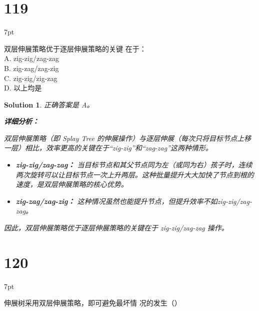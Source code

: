 \documentclass[UTF8]{report}
\newtheorem{solution}{Solution}
\theoremstyle{MyLineTheoremStyle} %
\theoremstyle{MyBlockTheoremStyle} %
\theoremstyle{MySubsubsectionStyle} %
\newenvironment{graybox}{%
        \def\FrameCommand{%
        \hspace{1pt}%
        {\color{gray}\small \vrule width 2pt}%
        {\color{graybox_color}\vrule width 4pt}%
        \colorbox{graybox_color}%
        }%
        \MakeFramed{\advance\hsize-\width\FrameRestore}%
        \noindent\hspace{-4.55pt}%
        \begin{adjustwidth}{}{7pt}%
        \vspace{2pt}\vspace{2pt}%
        }
        {%
        \vspace{2pt}\end{adjustwidth}\endMakeFramed%
        }
\begin{document}
\section*{119}
\begin{graybox}
双层伸展策略优于逐层伸展策略的关键
在于：\\
A. zig-zig/zag-zag\\
B. zig-zag/zag-zig\\
C. zig-zig/zig-zag\\
D. 以上均是
\end{graybox}

\begin{solution}
正确答案是 A。

\textbf{详细分析：}

双层伸展策略（即 Splay Tree 的伸展操作）与逐层伸展（每次只将目标节点上移一层）相比，效率更高的关键在于“zig-zig”和“zag-zag”这两种情形。

\begin{itemize}
    \item \textbf{zig-zig/zag-zag：} 当目标节点和其父节点同为左（或同为右）孩子时，连续两次旋转可以让目标节点一次上升两层。这种批量提升大大加快了节点到根的速度，是双层伸展策略的核心优势。
    \item \textbf{zig-zag/zag-zig：} 这种情况虽然也能提升节点，但提升效率不如zig-zig/zag-zag。
\end{itemize}

因此，双层伸展策略优于逐层伸展策略的关键在于 zig-zig/zag-zag 操作。

\end{solution}


\section*{120}
\begin{graybox}
伸展树采用双层伸展策略，即可避免最坏情
况的发生（）
\end{graybox}
\end{document}
